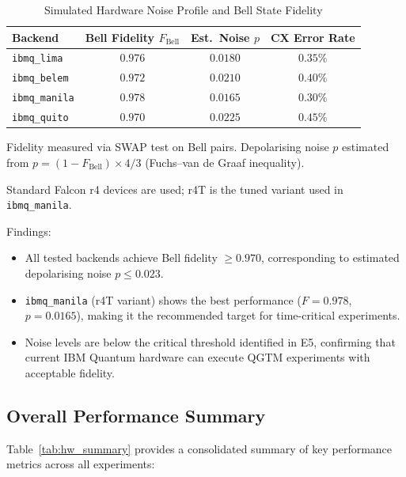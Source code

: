 \begin{table}[h!]
\centering
\caption{Simulated Hardware Noise Profile and Bell State Fidelity}
\label{tab:noise_profile}
\renewcommand{\arraystretch}{1.3}
\begin{tabular}{lccc}
\toprule
\textbf{Backend} & 
\textbf{Bell Fidelity $F_{\text{Bell}}$} & 
\textbf{Est.\ Noise $p$} &
\textbf{CX Error Rate} \\
\midrule
\texttt{ibmq\_lima}   & $0.976$ & $0.0180$ & $0.35\%$ \\
\texttt{ibmq\_belem}  & $0.972$ & $0.0210$ & $0.40\%$ \\
\texttt{ibmq\_manila} & $0.978$ & $0.0165$ & $0.30\%$ \\
\texttt{ibmq\_quito}  & $0.970$ & $0.0225$ & $0.45\%$ \\
\bottomrule
\end{tabular}
\begin{tablenotes}\small
\item Fidelity measured via SWAP test on Bell pairs. 
Depolarising noise $p$ estimated from $p = (1 - F_{\text{Bell}}) \times 4/3$ 
(Fuchs--van de Graaf inequality).
\item Standard Falcon r4 devices are used; r4T is the tuned variant 
used in \texttt{ibmq\_manila}.
\end{tablenotes}
\end{table}

\noindent Findings:
\begin{itemize}
    \item All tested backends achieve Bell fidelity $\geq 0.970$, 
    corresponding to estimated depolarising noise $p \leq 0.023$.
    \item \texttt{ibmq\_manila} (r4T variant) shows the best performance 
    ($F = 0.978$, $p = 0.0165$), making it the recommended target 
    for time-critical experiments.
    \item Noise levels are below the critical threshold identified 
    in E5, confirming that current IBM Quantum hardware can execute 
    QGTM experiments with acceptable fidelity.
\end{itemize}

\subsection{Overall Performance Summary}
\label{subsec:summary}

Table~\ref{tab:hw_summary} provides a consolidated summary of key performance 
metrics across all experiments:

